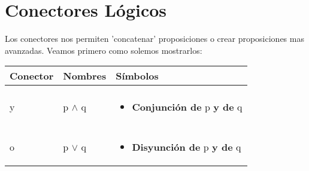 \documentclass[12pt, fleqn]{report}                             %
\begin{document}
        \clearpage
        \section{Conectores Lógicos}

            Los conectores nos permiten 'concatenar' proposiciones o crear proposiciones mas avanzadas. 
            Veamos primero como solemos mostrarlos:

            \begin{longtable}{p{35mm} || p{30mm} || p{80mm}}

                \textbf{\large Conector}
                &
                \textbf{\large Nombres}
                &
                \textbf{\large Símbolos}
                \\[1.5ex]
                \hline\hline
                & & \\                                                                    
                \endhead                                                     

                \large y  &  \large{p $\land$ q}                                    &

                \begin{minipage}[t]{\textwidth}\begin{itemize}
                    \item \textbf{Conjunción de} p \textbf{y de} q
                \end{itemize}\end{minipage}                                                 \\[1.5ex]
                
                \hline & & \\ \large o  &  \large{p $\lor$ q}                               &
                
                \begin{minipage}[t]{\textwidth}\begin{itemize}
                    \item \textbf{Disyunción de} p \textbf{y de} q
                \end{itemize}\end{minipage}                                                 \\[1.5ex]



\end{longtable}
\end{document}
